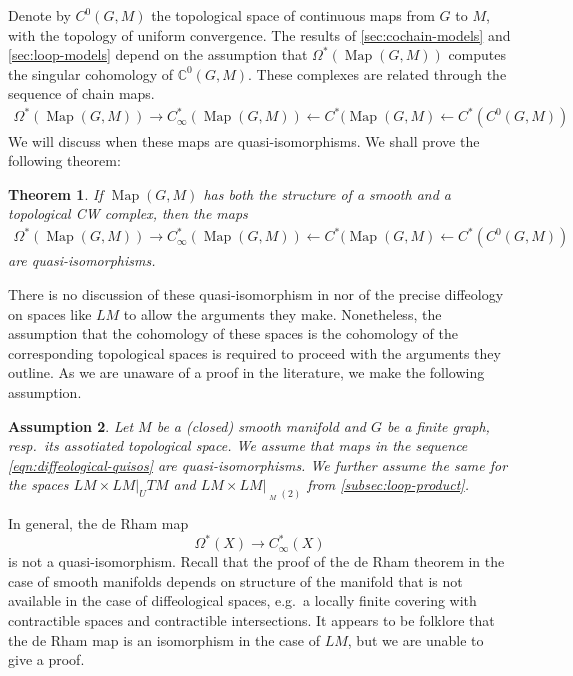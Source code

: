 \documentclass{scrartcl}
\theoremstyle{plain}
\newtheorem{theorem}{Theorem}[section]
\newtheorem{assumption}[theorem]{Assumption}
\theoremstyle{definition}
\newcommand{\C}{\mathbb C}
\newcommand{\from}{\leftarrow}
\DeclareMathOperator{\Map}{Map}
\DeclareMathOperator{\cConf}{\overline{Conf}}
\begin{document}
Denote by $C^0(G, M)$ the topological space of continuous maps from $G$ to $M$, with the topology of uniform convergence. The results of \cref{sec:cochain-models} and \cref{sec:loop-models} depend on the assumption that $\Omega^*(\Map(G, M))$ computes the singular cohomology of $\C^0(G, M)$. These complexes are related through the sequence of chain maps. 
\begin{align}
    \Omega^*(\Map(G, M)) \to C_\infty^*(\Map(G, M)) \from C^*(\Map(G, M)\from C^*(C^0(G, M)) \label{eqn:diffeological-quisos}
\end{align}
We will discuss when these maps are quasi-isomorphisms. We shall prove the following theorem: 
\begin{theorem}
    If $\Map(G, M)$ has both the structure of a smooth and a topological CW complex, then the maps \begin{align*}
        \Omega^*(\Map(G, M)) \to C_\infty^*(\Map(G, M)) \from C^*(\Map(G, M)\from C^*(C^0(G, M))
    \end{align*}
    are quasi-isomorphisms.
\end{theorem}
There is no discussion of these quasi-isomorphism in \cite{naef2019string} nor of the precise diffeology on spaces like $LM$ to allow the arguments they make. Nonetheless, the assumption that the cohomology of these spaces is the cohomology of the corresponding topological spaces is required to proceed with the arguments they outline. As we are unaware of a proof in the literature, we make the following assumption.  

\begin{assumption}\label{assumption}
    Let $M$ be a (closed) smooth manifold and $G$ be a finite graph, resp.\ its assotiated topological space. We assume that maps in the sequence \ref{eqn:diffeological-quisos} are quasi-isomorphisms. We further assume the same for the spaces $LM\times LM|_UTM$ and $LM\times LM|_{\cConf_M(2)}$ from \cref{subsec:loop-product}. 
\end{assumption}

In general, the de Rham map $$\Omega^*(X) \to C_\infty^*(X)$$ is not a quasi-isomorphism. Recall that the proof of the de Rham theorem in the case of smooth manifolds depends on structure of the manifold that is not available in the case of diffeological spaces, e.g.\ a locally finite covering with contractible spaces and contractible intersections. It appears to be folklore that the de Rham map is an isomorphism in the case of $LM$, but we are unable to give a proof. 
\end{document}
